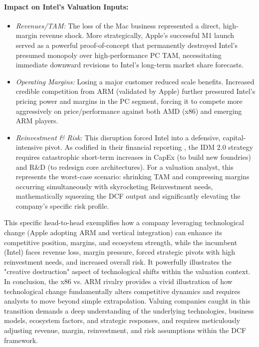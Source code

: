 \paragraph{Impact on Intel's Valuation Inputs:}
\begin{itemize}
    \item \textit{Revenues/TAM:} The loss of the Mac business represented a direct, high-margin revenue shock. More strategically, Apple's successful M1 launch \parencite{apple2020m1} served as a powerful proof-of-concept that permanently destroyed Intel's presumed monopoly over high-performance PC TAM, necessitating immediate downward revisions to Intel's long-term market share forecasts.
    \item \textit{Operating Margins:} Losing a major customer reduced scale benefits. Increased credible competition from ARM (validated by Apple) further pressured Intel's pricing power and margins in the PC segment, forcing it to compete more aggressively on price/performance against both AMD (x86) and emerging ARM players.
    \item \textit{Reinvestment \& Risk:} This disruption forced Intel into a defensive, capital-intensive pivot. As codified in their financial reporting \parencite{intel202410k}, the IDM 2.0 strategy requires catastrophic short-term increases in CapEx (to build new foundries) and R\&D (to redesign core architectures). For a valuation analyst, this represents the worst-case scenario: shrinking TAM and compressing margins occurring simultaneously with skyrocketing Reinvestment needs, mathematically squeezing the DCF output and significantly elevating the company's specific risk profile.
\end{itemize}

This specific head-to-head exemplifies how a company leveraging technological change (Apple adopting ARM and vertical integration) can enhance its competitive position, margins, and ecosystem strength, while the incumbent (Intel) faces revenue loss, margin pressure, forced strategic pivots with high reinvestment needs, and increased overall risk. It powerfully illustrates the "creative destruction" aspect of technological shifts within the valuation context.\\

In conclusion, the x86 vs. ARM rivalry provides a vivid illustration of how technological change fundamentally alters competitive dynamics and requires analysts to move beyond simple extrapolation. Valuing companies caught in this transition demands a deep understanding of the underlying technologies, business models, ecosystem factors, and strategic responses, and requires meticulously adjusting revenue, margin, reinvestment, and risk assumptions within the DCF framework.
